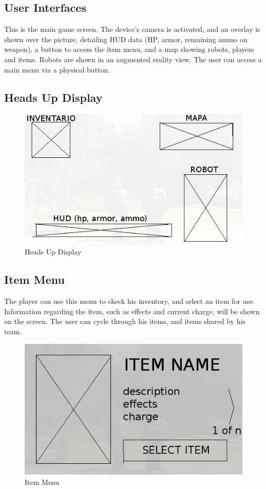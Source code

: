 \documentclass{beamer}
\begin{document}
\begin{frame}
\section{User Interfaces}
This is the main game screen. The device's camera is activated, and an overlay is shown over the picture, detailing HUD data (HP, armor, remaining ammo on weapon), a button to access the item menu, and a map showing robots, players and items. Robots are shown in an augmented reality view. The user can access a main menu via a physical button.
\subsection{Heads Up Display}
\begin{figure}[htb]
\centering
\includegraphics[scale=0.5]{hud}
\caption{Heads Up Display}
\end{figure}
\end{frame}
\begin{frame}
\subsection{Item Menu}
The player can use this menu to check his inventory, and select an item for use. Information regarding the item, such as effects and current charge, will be shown on the screen. The user can cycle through his items, and items shared by his team.
\begin{figure}[htb]
\centering
\includegraphics[scale=0.5]{item-menu}
\caption{Item Menu}
\end{figure}
\end{frame}
\end{document}
